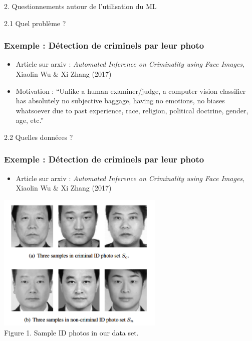 \documentclass[sans,14pt]{beamer}
\begin{document}
{\begin{frame}
  \begin{center}
    \Large 2. Questionnements autour de l'utilisation du ML
  \end{center}
\end{frame}


\begin{frame}
  \begin{center}
    \Large 2.1 Quel problème ?
  \end{center}
\end{frame}

\begin{frame}[t]
  \frametitle{Exemple : Détection de criminels par leur photo}
  \begin{itemize}
  \item Article sur arxiv : \textit{Automated Inference on Criminality using
      Face Images}, Xiaolin Wu \& Xi Zhang (2017)
  \item Motivation : \textcolor{MyBlue}{``Unlike a human examiner/judge, a
      computer vision classifier has absolutely no subjective baggage, having
      no emotions, no biases whatsoever due to past experience, race, religion,
      political doctrine, gender, age, etc.''}
  \end{itemize}
\end{frame}


\begin{frame}
  \begin{center}
    \Large 2.2 Quelles donnéees ?
  \end{center}
\end{frame}

\begin{frame}[t]
  \frametitle{Exemple : Détection de criminels par leur photo}
  \begin{itemize}
  \item Article sur arxiv : \textit{Automated Inference on Criminality using
      Face Images}, Xiaolin Wu \& Xi Zhang (2017)
  \end{itemize}
  \begin{center}
    \includegraphics[width=0.6\textwidth]{figures/criminals_wu_zhang_2016} \\
    \footnotesize Figure 1. Sample ID photos in our data set.
  \end{center}
\end{frame}


}
\end{document}
